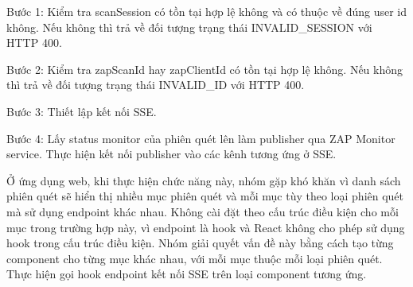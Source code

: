 Bước 1: Kiểm tra scanSession có tồn tại hợp lệ không và có thuộc về đúng user id không. Nếu không thì trả về đối tượng trạng thái INVALID\_SESSION với HTTP 400.

Bước 2: Kiểm tra zapScanId hay zapClientId có tồn tại hợp lệ không. Nếu không thì trả về đối tượng trạng thái INVALID\_ID với HTTP 400.

Bước 3: Thiết lập kết nối SSE.

Bước 4: Lấy status monitor của phiên quét lên làm publisher qua ZAP Monitor service. Thực hiện kết nối publisher vào các kênh tương ứng ở SSE.

Ở ứng dụng web, khi thực hiện chức năng này, nhóm gặp khó khăn vì danh sách phiên quét sẽ hiển thị nhiều mục phiên quét và mỗi mục tùy theo loại phiên quét mà sử dụng endpoint khác nhau. Không cài đặt theo cấu trúc điều kiện cho mỗi mục trong trường hợp này, vì endpoint là hook và React không cho phép sử dụng hook trong cấu trúc điều kiện. Nhóm giải quyết vấn đề này bằng cách tạo từng component cho từng mục khác nhau, với mỗi mục thuộc mỗi loại phiên quét. Thực hiện gọi hook endpoint kết nối SSE trên loại component tương ứng.